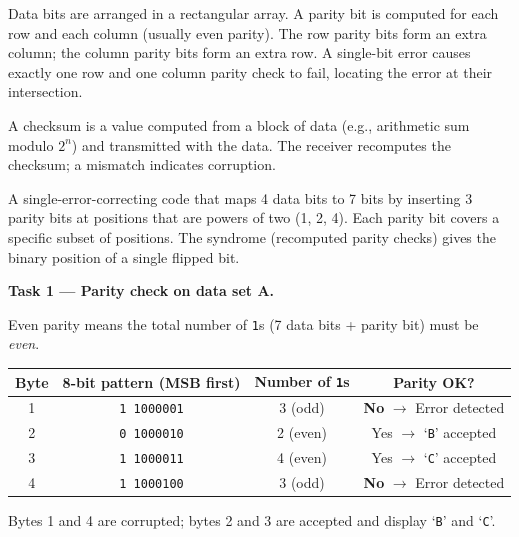 \documentclass[11pt]{article}
\newcounter{popsec}
\newcounter{popsub}
\newcommand{\courssub}[1]{%
  \stepcounter{popsub}%
  \par\vspace{9pt}\noindent{\popxbold\fontsize{11.5}{13}\selectfont\color{popink}{\color{poporange}\thepopsec.\thepopsub}\hspace{6pt}#1}\par\nopagebreak\vspace{4pt}
}
\begin{document}
\begin{definition}
Data bits are arranged in a rectangular array. A parity bit is computed for each row and each column (usually even parity). The row parity bits form an extra column; the column parity bits form an extra row. A single-bit error causes exactly one row and one column parity check to fail, locating the error at their intersection.
\end{definition}

\begin{definition}[Checksum]
A checksum is a value computed from a block of data (e.g., arithmetic sum modulo $2^n$) and transmitted with the data. The receiver recomputes the checksum; a mismatch indicates corruption.
\end{definition}

\begin{definition}
A single-error-correcting code that maps 4 data bits to 7 bits by inserting 3 parity bits at positions that are powers of two (1, 2, 4). Each parity bit covers a specific subset of positions. The syndrome (recomputed parity checks) gives the binary position of a single flipped bit.
\end{definition}

\courssub{Model answer}

\textbf{Task 1 --- Parity check on data set A.}

Even parity means the total number of \texttt{1}s (7 data bits + parity bit) must be \emph{even}.

\begin{center}
\begin{tabular}{|c|c|c|c|}
\hline
\rowcolor{popblueL} Byte & 8-bit pattern (MSB first) & Number of \texttt{1}s & Parity OK? \\
\hline
1 & \texttt{1\,1000001} & 3 (odd) & \textbf{No} $\rightarrow$ Error detected \\
\hline
2 & \texttt{0\,1000010} & 2 (even) & Yes $\rightarrow$ `\texttt{B}' accepted \\
\hline
3 & \texttt{1\,1000011} & 4 (even) & Yes $\rightarrow$ `\texttt{C}' accepted \\
\hline
4 & \texttt{1\,1000100} & 3 (odd) & \textbf{No} $\rightarrow$ Error detected \\
\hline
\end{tabular}
\end{center}

Bytes 1 and 4 are corrupted; bytes 2 and 3 are accepted and display `\texttt{B}' and `\texttt{C}'.
\end{document}
